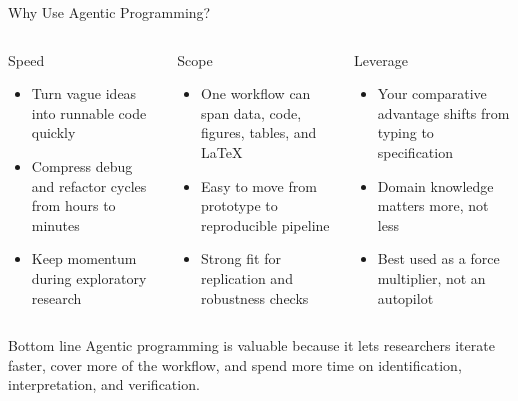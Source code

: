 \documentclass[aspectratio=169,10pt]{beamer}
\begin{document}
\begin{frame}{Why Use Agentic Programming?}
\small
\begin{columns}[T]
\begin{block}{Speed}
\begin{itemize}\itemsep2pt
    \item Turn vague ideas into runnable code quickly
    \item Compress debug and refactor cycles from hours to minutes
    \item Keep momentum during exploratory research
\end{itemize}
\end{block}

\begin{block}{Scope}
\begin{itemize}\itemsep2pt
    \item One workflow can span data, code, figures, tables, and LaTeX
    \item Easy to move from prototype to reproducible pipeline
    \item Strong fit for replication and robustness checks
\end{itemize}
\end{block}

\begin{block}{Leverage}
\begin{itemize}\itemsep2pt
    \item Your comparative advantage shifts from typing to specification
    \item Domain knowledge matters more, not less
    \item Best used as a force multiplier, not an autopilot
\end{itemize}
\end{block}
\end{columns}

\vspace{0.4em}
\begin{alertblock}{Bottom line}
Agentic programming is valuable because it lets researchers iterate faster,
cover more of the workflow, and spend more time on identification,
interpretation, and verification.
\end{alertblock}
\end{frame}
\end{document}
